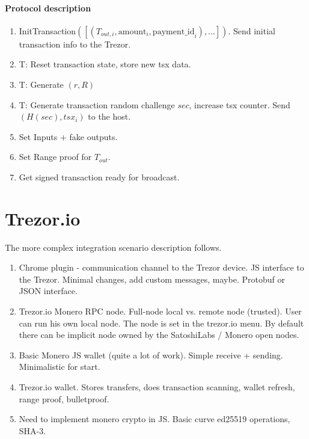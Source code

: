 \documentclass[]{article}
\begin{document}
\paragraph{Protocol description}
\begin{enumerate}
	\item InitTransaction$( [(T_{out,i}, \text{amount}_i, \text{payment\_id}_i), \dots])$. Send initial transaction info to the Trezor.
	
	\item T: Reset transaction state, store new tsx data.
	
	\item T: Generate $(r, R)$
	
	\item T: Generate transaction random challenge $sec$, increase tsx counter. Send $(H(sec), tsx_i)$ to the host. 
	
	\item Set Inputs + fake outputs.
	
	\item Set Range proof for $T_{out}$.
	
	\item Get signed transaction ready for broadcast.
	

\end{enumerate}

\section{Trezor.io}

The more complex integration scenario description follows.
\begin{enumerate}
	\item Chrome plugin - communication channel to the Trezor device. 
	JS interface to the Trezor. Minimal changes, add custom messages, maybe.
	Protobuf or JSON interface.
	
	\item Trezor.io Monero RPC node. Full-node local vs. remote node (trusted). User can run his own local node. The node is set in the trezor.io menu. By default there can be implicit node owned by the SatoshiLabs / Monero open nodes.
	
	\item Basic Monero JS wallet (quite a lot of work). Simple receive + sending. Minimalistic for start.
	
	\item Trezor.io wallet. Stores transfers, does transaction scanning, wallet refresh, range proof, bulletproof. 
	 
	\item Need to implement monero crypto in JS. Basic curve ed25519 operations, SHA-3.
	 
\end{enumerate}
\end{document}
